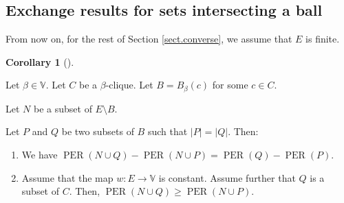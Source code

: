 \documentclass[numbers=enddot,12pt,final,onecolumn,notitlepage]{scrartcl}%
\theoremstyle{definition}
\newtheorem{coro}[theo]{Corollary}
\newenvironment{corollary}[1][]
{\begin{coro}[#1]\begin{leftbar}}
{\end{leftbar}\end{coro}}
\renewcommand{\geq}{\geqslant}
\theoremstyle{plainsl}
\begin{document}
\subsection{Exchange results for sets intersecting a ball}

From now on, for the rest of Section \ref{sect.converse}, we assume that $E$
is finite.

\begin{corollary}
\label{cor.clique-and-clball2}Let $\beta\in\mathbb{V}$. Let $C$ be a $\beta
$-clique. Let $B=B_{\beta}\left(  c\right)  $ for some $c\in C$.

Let $N$ be a subset of $E\setminus B$.

Let $P$ and $Q$ be two subsets of $B$ such that $\left\vert P\right\vert
=\left\vert Q\right\vert $. Then:

\begin{enumerate}
\item[\textbf{(a)}] We have $\operatorname*{PER}\left(  N\cup Q\right)
-\operatorname*{PER}\left(  N\cup P\right)  =\operatorname*{PER}\left(
Q\right)  -\operatorname*{PER}\left(  P\right)  $.

\item[\textbf{(b)}] Assume that the map $w:E\rightarrow\mathbb{V}$ is
constant. Assume further that $Q$ is a subset of $C$. Then,
$\operatorname*{PER}\left(  N\cup Q\right)  \geq\operatorname*{PER}\left(
N\cup P\right)  $.
\end{enumerate}
\end{corollary}
\end{document}
